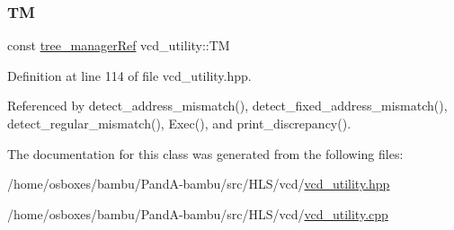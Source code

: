 \subsubsection{\texorpdfstring{TM}{TM}}
{\footnotesize\ttfamily const \hyperlink{tree__manager_8hpp_a96ff150c071ce11a9a7a1e40590f205e}{tree\+\_\+manager\+Ref} vcd\+\_\+utility\+::\+TM\hspace{0.3cm}{\ttfamily [protected]}}



Definition at line 114 of file vcd\+\_\+utility.\+hpp.



Referenced by detect\+\_\+address\+\_\+mismatch(), detect\+\_\+fixed\+\_\+address\+\_\+mismatch(), detect\+\_\+regular\+\_\+mismatch(), Exec(), and print\+\_\+discrepancy().



The documentation for this class was generated from the following files\+:\begin{DoxyCompactItemize}
\item 
/home/osboxes/bambu/\+Pand\+A-\/bambu/src/\+H\+L\+S/vcd/\hyperlink{vcd__utility_8hpp}{vcd\+\_\+utility.\+hpp}\item 
/home/osboxes/bambu/\+Pand\+A-\/bambu/src/\+H\+L\+S/vcd/\hyperlink{vcd__utility_8cpp}{vcd\+\_\+utility.\+cpp}\end{DoxyCompactItemize}
